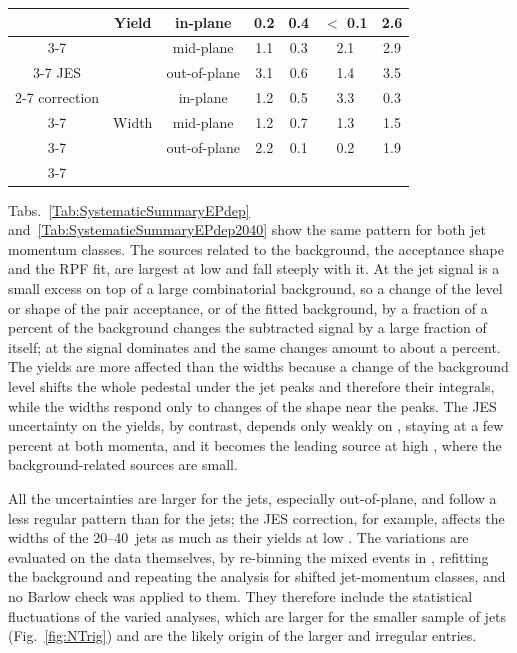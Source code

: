 \begin{table}[!htbp]
\begin{tabular}{c | c | c | c | c | c | c}
		\multirow{6}{*}{} & \multirow{3}{*}{Yield} & in-plane & 0.2 & 0.4 & $<$ 0.1 & 2.6 \\ \cline{3-7}
		& & mid-plane & 1.1 & 0.3 & 2.1 & 2.9 \\ \cline{3-7}
		JES & & out-of-plane & 3.1 & 0.6 & 1.4 & 3.5  \\ \cline{2-7}
		correction & \multirow{3}{*}{Width} & in-plane & 1.2 & 0.5 & 3.3 & 0.3 \\ \cline{3-7}
		& & mid-plane    & 1.2 & 0.7 & 1.3 & 1.5 \\ \cline{3-7}
		& & out-of-plane & 2.2 & 0.1 & 0.2 & 1.9 \\ \cline{3-7} 
		\hline
	\end{tabular}
\end{table}

Tabs.~\ref{Tab:SystematicSummaryEPdep} and~\ref{Tab:SystematicSummaryEPdep2040} show the same pattern for both jet momentum classes.
%
The sources related to the background, the acceptance shape and the RPF fit, are largest at low  and fall steeply with it.
%
At  the jet signal is a small excess on top of a large combinatorial background, so a change of the level or shape of the pair acceptance, or of the fitted background, by a fraction of a percent of the background changes the subtracted signal by a large fraction of itself; at  the signal dominates and the same changes amount to about a percent.
%
The yields are more affected than the widths because a change of the background level shifts the whole pedestal under the jet peaks and therefore their integrals, while the widths respond only to changes of the shape near the peaks.
%
The JES uncertainty on the yields, by contrast, depends only weakly on , staying at a few percent at both momenta, and it becomes the leading source at high , where the background-related sources are small.

All the uncertainties are larger for the  jets, especially out-of-plane, and follow a less regular pattern than for the  jets; the JES correction, for example, affects the widths of the 20--40~\GeVc jets as much as their yields at low .
%
The variations are evaluated on the data themselves, by re-binning the mixed events in \zvtx, refitting the background and repeating the analysis for shifted jet-momentum classes, and no Barlow check was applied to them.
%
They therefore include the statistical fluctuations of the varied analyses, which are larger for the smaller sample of  jets (Fig.~\ref{fig:NTrig}) and are the likely origin of the larger and irregular entries.

